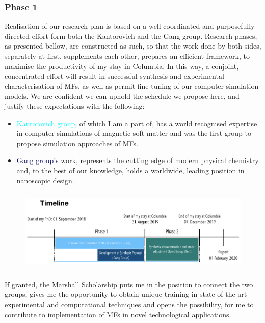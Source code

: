 \documentclass{article}
\begin{document}
\subsubsection{Phase 1}
Realisation of our research plan is based on a well coordinated and purposefully directed effort form both  the Kantorovich and the Gang group. Research phases, as presented bellow, are constructed as such, so that the work done by both sides, separately at first, supplements each other, prepares an efficient framework, to maximise the productivity of my stay in Columbia. In this way, a conjoint, concentrated effort will result in successful synthesis and experimental characterisation of MFs, as well as permit fine-tuning of our computer simulation models. We are confident we can uphold the schedule we propose here, and justify these expectations with the following:
\begin{itemize}
    \item{\textcolor{cyan}{Kantorovich group}, of which I am a part of, has a world recognised expertise in computer simulations of magnetic soft matter and was the first group to propose simulation approaches of MFs.}
    \item{\textcolor{MidnightBlue}{Gang group’s} work, represents the cutting edge of modern physical chemistry and, to the best of our knowledge, holds a worldwide, leading position in nanoscopic design.}
\end{itemize}
\begin{figure}[h]
\centering
  \includegraphics[height=4cm]{fig1}
\end{figure}
If granted, the Marshall Scholarship puts me in the position to connect the two groups, gives me the opportunity to obtain unique training in state of the art experimental and computational techniques and opens the possibility, for me to contribute to implementation of MFs in novel technological applications.
\end{document}
